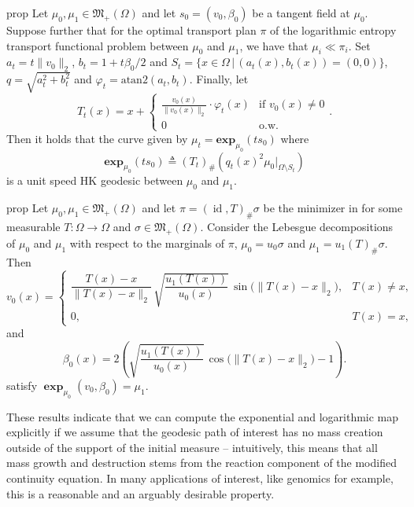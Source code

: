 \documentclass[11pt]{article}
\begin{document}
\begin{restatable}{prop}{} \label{HK exponential map closed form}
    Let $\mu_0, \mu_1 \in \mathfrak{M}_+(\Omega)$ and let $s_0 = (v_0, \beta_0)$ be a tangent field at $\mu_0$. Suppose further that for the optimal transport plan $\pi$ of the logarithmic entropy transport functional problem between $\mu_0$ and $\mu_1$, we have that $\mu_i \ll \pi_i$. Set $a_t = t\|v_0\|_2$, $b_t = 1 + t\beta_0/2$ and $S_t = \{x \in \Omega \, | \, (a_t(x), b_t(x)) = (0, 0) \}$, $q = \sqrt{a_t^2 + b_t^2}$ and $\varphi_t = \text{atan2}(a_t, b_t).$ Finally, let 
    \[T_t ( x) = x + \begin{cases}
        \frac{v_0(x)}{\|v_0(x)\|_2}\cdot \varphi_t(x) & \text{if } v_0(x) \neq 0 \\
        0 & \text{o.w.}
    \end{cases}.\]
    Then it holds that the curve given by $\mu_t = \mathbf{exp}_{\mu_0}(ts_0)$ where 
    \[\mathbf{exp}_{\mu_0}(ts_0) \triangleq (T_t)_\#(q_t(x)^2 \mu_0|_{\Omega \setminus S_t})\]
    is a unit speed HK geodesic between $\mu_0$ and $\mu_1$.  

\end{restatable}

\begin{restatable}{prop}{} \label{HK logarithmic map closed form}
    Let $\mu_0, \mu_1 \in \mathfrak{M}_+(\Omega)$ and let $\pi = (\operatorname{id}, T)_\#\sigma$ be the minimizer in  for some measurable $T: \Omega \rightarrow\Omega$ and $\sigma \in \mathfrak{M}_+(\Omega)$. Consider the Lebesgue decompositions of $\mu_0$ and $\mu_1$ with respect to the marginals of $\pi$, $\mu_0 = u_0 \sigma$ and $\mu_1 = u_1 (T)_\# \sigma$. Then 
        \[
        v_0(x) =
        \begin{cases}
        \dfrac{T(x)-x}{\|T(x)-x\|_2}\,
        \sqrt{\dfrac{u_{1}(T(x))}{u_0(x)}}\,
        \sin\bigl(\|T(x)-x\|_2\bigr),
        & T(x)\neq x,\\
        0, & T(x)=x,
        \end{cases}
    \]
    and
    \[
        \beta_0(x)
        =
        2\left(
        \sqrt{\dfrac{u_{1}(T(x))}{u_0(x)}}\,
        \cos\bigl(\|T(x)-x\|_2\bigr)-1
        \right).
    \]
    satisfy $\boldsymbol{\exp}_{\mu_0}(v_0, \beta_0) = \mu_1$.
\end{restatable}

These results indicate that we can compute the exponential and logarithmic map explicitly if we assume that the geodesic path of interest has no mass creation outside of the support of the initial measure -- intuitively, this means that all mass growth and destruction stems from the reaction component of the modified continuity equation. In many applications of interest, like genomics for example, this is a reasonable and an arguably desirable property.    
\end{document}
